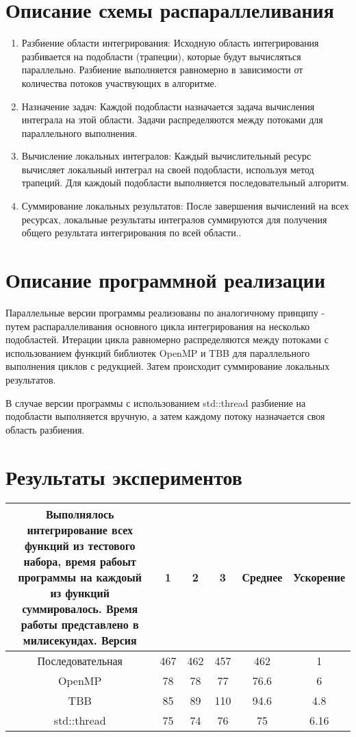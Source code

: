 \documentclass[14pt, a4paper]{extarticle}
\begin{document}
\newpage
\section{Описание схемы распараллеливания}

  \begin{enumerate}
    \item   Разбиение области интегрирования: Исходную область интегрирования разбивается на подобласти (трапеции), которые будут вычисляться параллельно. Разбиение выполняется равномерно в зависимости от количества потоков участвующих в алгоритме.
    \item   Назначение задач: Каждой подобласти назначается задача вычисления интеграла на этой области. Задачи распределяются между потоками для параллельного выполнения.
    \item   Вычисление локальных интегралов: Каждый вычислительный ресурс вычисляет локальный интеграл на своей подобласти, используя метод трапеций. Для каждоый подобласти выполняется последовательный алгоритм.
    \item   Суммирование локальных результатов: После завершения вычислений на всех ресурсах, локальные результаты интегралов суммируются для получения общего результата интегрирования по всей области..
  \end{enumerate}



\section{Описание программной реализации}

Параллельные версии программы реализованы по аналогичному принципу - путем распараллеливания основного цикла интегрирования на несколько подобластей. Итерации цикла равномерно распределяются между потоками с использованием функций библиотек OpenMP и TBB для параллельного выполнения циклов с редукцией. Затем происходит суммирование локальных результатов.

В случае версии программы с использованием std::thread разбиение на подобласти выполняется вручную, а затем каждому потоку назначается своя область разбиения.

\section{Результаты экспериментов}


\begin{tabular}{|c||c|c|c||c|c|} \hline

Выполнялось интегрирование всех функций из тестового набора, время рабоыт программы на каждоый из функций суммировалось. Время работы представлено в милисекундах.
Версия & 1  & 2  & 3  & Среднее & Ускорение \\ \hline \hline
 Последовательная & 467 & 462 & 457 & 462 & 1 \\ \hline
 OpenMP           & 78 & 78 & 77 & 76.6 & 6 \\ \hline
 TBB              & 85 & 89 & 110 & 94.6 & 4.8 \\ \hline
 std::thread      & 75 & 74 & 76 & 75 & 6.16 \\ \hline
\end{tabular}
\end{document}
